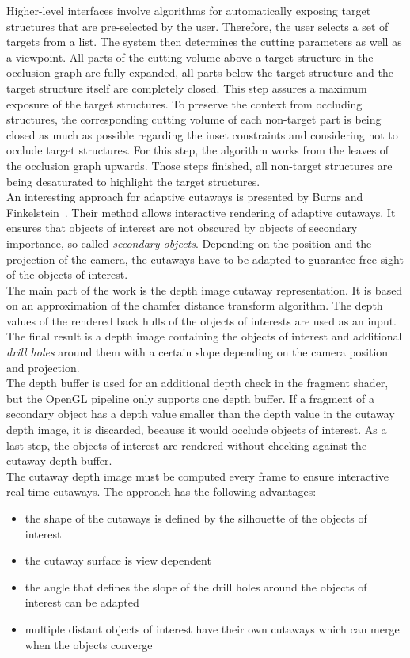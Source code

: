 Higher-level interfaces involve algorithms for automatically exposing target structures that are pre-selected by the user. Therefore, the user selects a set of targets from a list. The system then determines the cutting parameters as well as a viewpoint. All parts of the cutting volume above a target structure in the occlusion graph are fully expanded, all parts below the target structure and the target structure itself are completely closed. This step assures a maximum exposure of the target structures. To preserve the context from occluding structures, the corresponding cutting volume of each non-target part is being closed as much as possible regarding the inset constraints and considering not to occlude target structures. For this step, the algorithm works from the leaves of the occlusion graph upwards. Those steps finished, all non-target structures are being desaturated to highlight the target structures.\\
\newline
An interesting approach for adaptive cutaways is presented by Burns and Finkelstein~\cite{jour:adaptiveCutaways}. Their method allows interactive rendering of adaptive cutaways. It ensures that objects of interest are not obscured by objects of secondary importance, so-called \emph{secondary objects}. Depending on the position and the projection of the camera, the cutaways have to be adapted to guarantee free sight of the objects of interest.\\
The main part of the work is the depth image cutaway representation. It is based on an approximation of the chamfer distance transform algorithm. The depth values of the rendered back hulls of the objects of interests are used as an input. The final result is a depth image containing the objects of interest and additional \emph{drill holes} around them with a certain slope depending on the camera position and projection.\\
The depth buffer is used for an additional depth check in the fragment shader, but the OpenGL pipeline only supports one depth buffer. If a fragment of a secondary object has a depth value smaller than the depth value in the cutaway depth image, it is discarded, because it would occlude objects of interest. As a last step, the objects of interest are rendered without checking against the cutaway depth buffer.\\
The cutaway depth image must be computed every frame to ensure interactive real-time cutaways. The approach has the following advantages:
\begin{itemize}
	\item the shape of the cutaways is defined by the silhouette of the objects of interest
	\item the cutaway surface is view dependent
	\item the angle that defines the slope of the drill holes around the objects of interest can be adapted
	\item multiple distant objects of interest have their own cutaways which can merge when the objects converge
\end{itemize}
